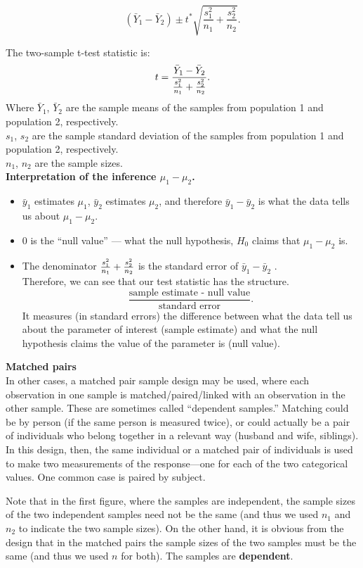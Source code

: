 \documentclass[10pt, a4paper]{article}
\begin{document}
\begin{enumerate}
\begin{itemize}
\[
    (\bar{Y}_1 - \bar{Y}_2) \pm t^* \sqrt{\frac{s_1^2}{n_1} + \frac{s^2_2}{n_2}}.
\]
\end{itemize}
The two-sample t-test statistic is:
\[
    t = \frac{\bar{Y}_1 - \bar{Y}_2}{{s_1^2 \over n_1} + {s_2^2 \over n_2}}.
\]
Where
$\bar{Y}_1$, $\bar{Y}_2$ are the sample means of the samples from population 1 and population 2, respectively.\\
$s_1$, $s_2$ are the sample standard deviation of the samples from population 1 and population 2, respectively.\\
$n_1$, $n_2$ are the sample sizes. \\
\textbf{Interpretation of the inference $\mu_1-\mu_2$.}
\begin{itemize}
\item $\bar{y}_1$ estimates $\mu_1$, $\bar{y}_2$ estimates $\mu_2$, and therefore $\bar{y}_1 - \bar{y}_2$ is what the data tells us about $\mu_1-\mu_2$.
\item 0 is the ``null value'' --- what the null hypothesis, $H_0$ claims that $\mu_1-\mu_2$ is.
\item The denominator ${{s_1^2 \over n_1} + {s_2^2 \over n_2}}$ is the standard error of $\bar{y}_1 - \bar{y}_2$ .\\
Therefore, we can see that our test statistic has the structure.
\[
\frac{\text{sample estimate - null value}}{\text{standard error}}.
\]
It measures (in standard errors) the difference between what the data tell us about the parameter of interest (sample estimate) and what the null hypothesis claims the value of the parameter is (null value).
\end{itemize}
\end{enumerate}
\textbf{Matched pairs}\\
In other cases, a matched pair sample design may be used, where each observation in one sample is matched/paired/linked with an observation in the other sample. These are sometimes called ``dependent samples.'' Matching could be by person (if the same person is measured twice), or could actually be a pair of individuals who belong together in a relevant way (husband and wife, siblings). In this design, then, the same individual or a matched pair of individuals is used to make two measurements of the response---one for each of the two categorical values. One common case is paired by subject.\par
Note that in the first figure, where the samples are independent, the sample sizes of the two independent samples need not be the same (and thus we used $n_1$ and $n_2$ to indicate the two sample sizes). On the other hand, it is obvious from the design that in the matched pairs the sample sizes of the two samples must be the same (and thus we used $n$ for both).  The samples are \textbf{dependent}.
\end{document}
